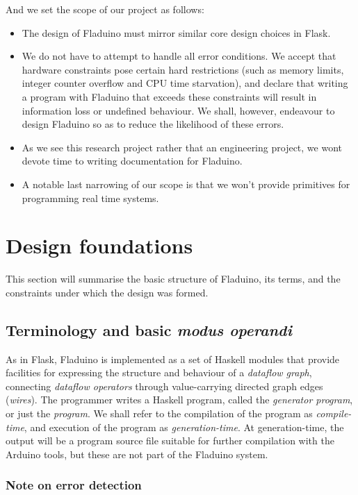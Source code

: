 \documentclass[a4paper, oneside, final]{memoir}
\begin{document}
And we set the scope of our project as follows:
\begin{itemize}
\item The design of Fladuino must mirror similar core design choices
  in Flask.
\item We do not have to attempt to handle all error conditions.  We
  accept that hardware constraints pose certain hard restrictions
  (such as memory limits, integer counter overflow and CPU time
  starvation), and declare that writing a program with Fladuino that
  exceeds these constraints will result in information loss or
  undefined behaviour.  We shall, however, endeavour to design
  Fladuino so as to reduce the likelihood of these errors.
\item As we see this research project rather that an engineering
  project, we wont devote time to writing documentation for Fladuino.
\item A notable last narrowing of our scope is that we won't provide
  primitives for programming real time systems.
\end{itemize}

\section{Design foundations}

This section will summarise the basic structure of Fladuino, its
terms, and the constraints under which the design was formed.

\subsection{Terminology and basic \textit{modus operandi}}

As in Flask, Fladuino is implemented as a set of Haskell modules that
provide facilities for expressing the structure and behaviour of a
\textit{dataflow graph}, connecting \textit{dataflow operators}
through value-carrying directed graph edges (\textit{wires}).  The
programmer writes a Haskell program, called the \textit{generator
  program}, or just the \textit{program}.  We shall refer to the
compilation of the program as \textit{compile-time}, and execution of
the program as \textit{generation-time}.  At generation-time, the
output will be a program source file suitable for further compilation
with the Arduino tools, but these are not part of the Fladuino system.

\subsubsection{Note on error detection}
\end{document}
